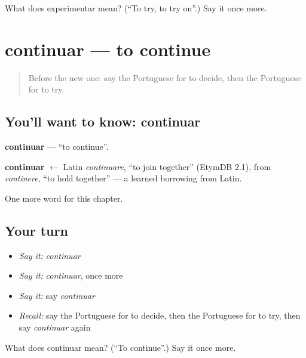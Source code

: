\begin{tcolorbox}[breakable,colback=teal!4,colframe=teal!35!black,title={Before you move on}]
What does experimentar mean? (\textquotedblleft{}To try, to try on\textquotedblright{}.) Say it once more.
\end{tcolorbox}
\section[continuar]{continuar — to continue}

\label{lesson:PT-C139-continuar}



\begin{quote}
Before the new one: say the Portuguese for to decide, then the Portuguese for to try.
\end{quote}

\subsection*{You'll want to know: continuar}
\textbf{continuar} — \textquotedblleft{}to continue\textquotedblright{}.

\begin{cousinweb}
\textbf{continuar} $\leftarrow$ Latin \emph{continuare}, \textquotedblleft{}to join together\textquotedblright{} (EtymDB 2.1), from \emph{continere}, \textquotedblleft{}to hold together\textquotedblright{} — a learned borrowing from Latin.
\end{cousinweb}

\begin{grammarlens}[title={What you've built}]
One more word for this chapter.
\end{grammarlens}

\subsection*{Your turn}
\begin{itemize}
\raggedright
  \item \emph{Say it:} \emph{continuar}
  \item \emph{Say it:} \emph{continuar}, once more
  \item \emph{Say it:} say \emph{continuar}
  \item \emph{Recall:} say the Portuguese for to decide, then the Portuguese for to try, then say \emph{continuar} again
\end{itemize}

\begin{tcolorbox}[breakable,colback=teal!4,colframe=teal!35!black,title={Before you move on}]
What does continuar mean? (\textquotedblleft{}To continue\textquotedblright{}.) Say it once more.
\end{tcolorbox}
